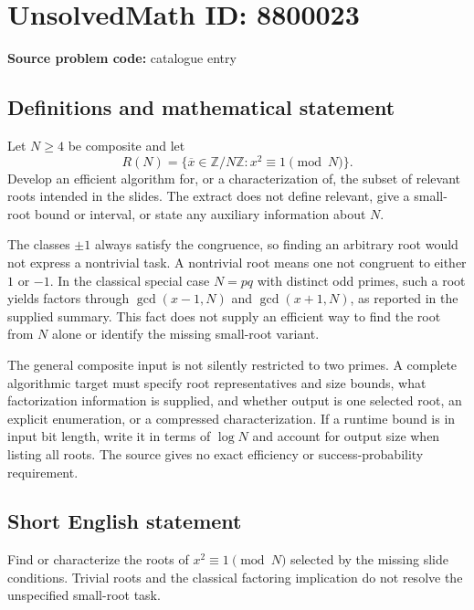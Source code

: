 \documentclass[11pt]{article}
\begin{document}
\section*{UnsolvedMath ID: 8800023}
\textbf{Source problem code:} catalogue entry
\subsection{Definitions and mathematical statement}
Let $N\geq4$ be composite and let
\[
R(N)=\{\overline x\in\mathbb Z/N\mathbb Z:x^2\equiv1\pmod N\}.
\]
Develop an efficient algorithm for, or a characterization of, the subset of relevant roots intended in the slides. The extract does not define relevant, give a small-root bound or interval, or state any auxiliary information about $N$.

The classes $\pm1$ always satisfy the congruence, so finding an arbitrary root would not express a nontrivial task. A nontrivial root means one not congruent to either $1$ or $-1$. In the classical special case $N=pq$ with distinct odd primes, such a root yields factors through $\gcd(x-1,N)$ and $\gcd(x+1,N)$, as reported in the supplied summary. This fact does not supply an efficient way to find the root from $N$ alone or identify the missing small-root variant.

The general composite input is not silently restricted to two primes. A complete algorithmic target must specify root representatives and size bounds, what factorization information is supplied, and whether output is one selected root, an explicit enumeration, or a compressed characterization. If a runtime bound is in input bit length, write it in terms of $\log N$ and account for output size when listing all roots. The source gives no exact efficiency or success-probability requirement.
\subsection{Short English statement}
Find or characterize the roots of $x^2\equiv1\pmod N$ selected by the missing slide conditions. Trivial roots and the classical factoring implication do not resolve the unspecified small-root task.
\end{document}
